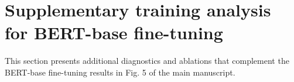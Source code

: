 \documentclass[fleqn,10pt]{wlscirep}
\newcommand{\SIEndSection}{\FloatBarrier\clearpage}
\begin{document}

\SIEndSection

\section{Supplementary training analysis for BERT-base fine-tuning}
\label{sec:S6}

\noindent
This section presents additional diagnostics and ablations that complement the BERT-base fine-tuning results in Fig. 5 of the main manuscript.
\end{document}
